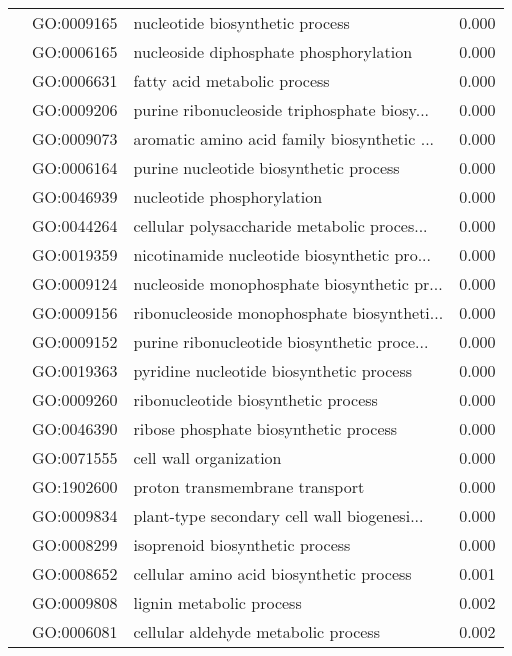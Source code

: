 \begin{longtable}{lllr}
   & GO:0009165 &              nucleotide biosynthetic process &         0.000 \\
   & GO:0006165 &       nucleoside diphosphate phosphorylation &         0.000 \\
   & GO:0006631 &                 fatty acid metabolic process &         0.000 \\
   & GO:0009206 &  purine ribonucleoside triphosphate biosy... &         0.000 \\
   & GO:0009073 &  aromatic amino acid family biosynthetic ... &         0.000 \\
   & GO:0006164 &       purine nucleotide biosynthetic process &         0.000 \\
   & GO:0046939 &                   nucleotide phosphorylation &         0.000 \\
   & GO:0044264 &  cellular polysaccharide metabolic proces... &         0.000 \\
   & GO:0019359 &  nicotinamide nucleotide biosynthetic pro... &         0.000 \\
   & GO:0009124 &  nucleoside monophosphate biosynthetic pr... &         0.000 \\
   & GO:0009156 &  ribonucleoside monophosphate biosyntheti... &         0.000 \\
   & GO:0009152 &  purine ribonucleotide biosynthetic proce... &         0.000 \\
   & GO:0019363 &     pyridine nucleotide biosynthetic process &         0.000 \\
   & GO:0009260 &          ribonucleotide biosynthetic process &         0.000 \\
   & GO:0046390 &        ribose phosphate biosynthetic process &         0.000 \\
   & GO:0071555 &                       cell wall organization &         0.000 \\
   & GO:1902600 &               proton transmembrane transport &         0.000 \\
   & GO:0009834 &  plant-type secondary cell wall biogenesi... &         0.000 \\
   & GO:0008299 &              isoprenoid biosynthetic process &         0.000 \\
   & GO:0008652 &     cellular amino acid biosynthetic process &         0.001 \\
   & GO:0009808 &                     lignin metabolic process &         0.002 \\
   & GO:0006081 &          cellular aldehyde metabolic process &         0.002 \\

\end{longtable}
